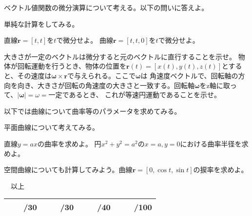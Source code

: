 \documentclass[a4j,dvipdfmx]{jsarticle}
\begin{document}
        ベクトル値関数の微分演算について考える。以下の問いに答えよ。
        \begin{qparts}
            \qpart 単純な計算をしてみる。
            \begin{qlist}
                \qitem 直線$\bm{r}=[t,t]$を$t$で微分せよ。
                \qitem 曲線$\bm{r}=[t,t,0]$を$t$で微分せよ。
            \end{qlist}
            \qpart 大きさが一定のベクトルは微分すると元のベクトルに直行することを示せ。
            \qpart 物体が回転運動を行うとき、物体の位置を$\bm{r}(t)=[x(t),y(t),z(t)]$とすると、その速度は$\bm{\omega}\times\bm{r}$で与えられる。ここで$\bm{\omega}$は
            角速度ベクトルで、回転軸の方向を向き、大きさが回転の角速度の大きさと一致する。回転軸$\bm{\omega}$をz軸に取って、$|\bm{\omega}|=\omega=一定$であるとき、
            これが等速円運動であることを示せ。
        \end{qparts}
    \clearpage
        以下では曲線について曲率等のパラメータを求めてみる。
        \begin{qparts}
            \qpart 平面曲線について考えてみる。
            \begin{qlist}
                \qitem 直線$\displaystyle y=ax$の曲率を求めよ。\vspace{0.5mm}
                \qitem 円$\displaystyle x^2+y^2=a^2$の$x=a,y=0$における曲率半径を求めよ。
            \end{qlist}
            \qpart 空間曲線についても計算してみよう。曲線$\bm{r}=[0,\cos t,\sin t]$の捩率を求めよ。
        \end{qparts}
    \hrulefill 　以上　\hrulefill
    \begin{table}[h]
        \centering
        \begin{tabular}{|c|c|c||c|}\hline
            　　/30 & 　　/30 & 　　/40 & 　　/100\\\hline
        \end{tabular}
    \end{table}
\end{document}
